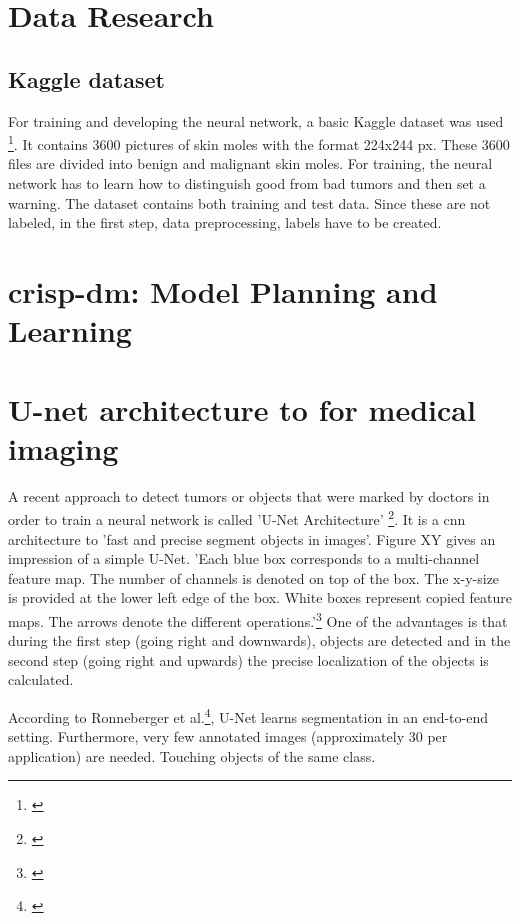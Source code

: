 \section{Data Research}
\subsection{Kaggle dataset}
For training and developing the neural network, a basic Kaggle dataset was used \footnote{\cite{kaggle_dataset}}. It contains 3600 pictures of skin moles with the format 224x244 px. These 3600 files are divided into benign and malignant skin moles. 
For training, the neural network has to learn how to distinguish good from bad tumors and then set a warning. 
The dataset contains both training and test data. Since these are not labeled, in the first step, data preprocessing, labels have to be created.

\section{\ac{crisp-dm}: Model Planning and Learning}

\section{U-net architecture to for medical imaging}
A recent approach to detect tumors or objects that were marked by doctors in order to train a neural network is called 'U-Net Architecture' \footnote{\cite{unet}}. It is a \ac{cnn} architecture to 'fast and precise segment objects in images'.
Figure XY gives an impression of a simple U-Net. 
'Each blue box corresponds to a multi-channel feature map. The number of channels is denoted on top of the box. The x-y-size is provided at the lower left edge of the box. White boxes represent copied feature maps. The arrows denote the different operations.'\footnote{\cite{unet}}
One of the advantages is that during the first step (going right and downwards), objects are detected and in the second step (going right and upwards) the precise localization of the objects is calculated. 


According to Ronneberger et al.\footnote{\cite{unet_freiburg}}, U-Net learns segmentation in an end-to-end setting. Furthermore, very few annotated images (approximately 30 per application) are needed. Touching objects of the same class.

